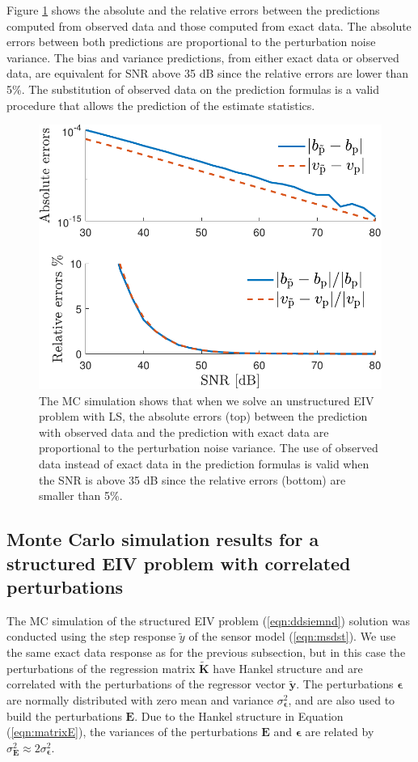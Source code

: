 Figure \ref{fig:bv_btvt_abse_rele_unstr_e7} shows the absolute and the relative errors between the predictions computed from observed data and those computed from exact data.
The absolute errors between both predictions are proportional to the perturbation noise variance.
The bias and variance predictions, from either exact data or observed data, are equivalent for SNR above 35 dB since the relative errors are lower than 5\%.
The substitution of observed data on the prediction formulas is a valid procedure that allows the prediction of the estimate statistics.

\begin{figure}[htb!]
  \centering
  \includegraphics[width=0.69\columnwidth]{./ChapterStatisticalAnalysis/fig/Fig_5.pdf} 
  \caption{ \label{fig:bv_btvt_abse_rele_unstr_e7} The MC simulation shows that when we solve an unstructured EIV problem with LS, the absolute errors (top) between the prediction with observed data and the prediction with exact data are proportional to the perturbation noise variance. The use of observed data instead of exact data in the prediction formulas is valid when the SNR is above 35 dB since the relative errors (bottom) are smaller than 5\%. } 
\end{figure}


\subsection{Monte Carlo simulation results for a structured EIV problem with correlated perturbations}

\color{blue}The MC simulation of the structured EIV problem (\ref{eqn:ddsiemnd}) solution was conducted using the step response $\widetilde{{y}}$ of the sensor model (\ref{eqn:msdst}).
We use the same exact data response as for the previous subsection, but in this case the perturbations of the regression matrix $\widetilde{\mathbf{K}}$ have Hankel structure and are correlated with the perturbations of the regressor vector $\widetilde{\mathbf{y}}$.
The perturbations $\bm{\epsilon}$ are normally distributed with zero mean and variance $\sigma_{\bm{\epsilon}}^2$, and are also used to build the perturbations $\mathbf{E}$.
Due to the Hankel structure in Equation (\ref{eqn:matrixE}), the variances of the perturbations $\mathbf{E}$ and $\bm{\epsilon}$ are related by $\sigma_{\mathbf{E}}^2 \approx 2 \sigma_{\bm{\epsilon}}^2$.

